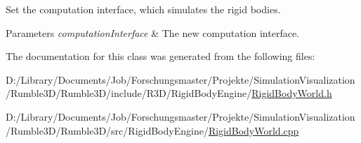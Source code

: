Set the computation interface, which simulates the rigid bodies. 


\begin{DoxyParams}{Parameters}
{\em computation\+Interface} & The new computation interface. \\
\hline
\end{DoxyParams}


The documentation for this class was generated from the following files\+:\begin{DoxyCompactItemize}
\item 
D\+:/\+Library/\+Documents/\+Job/\+Forschungsmaster/\+Projekte/\+Simulation\+Visualization/\+Rumble3\+D/\+Rumble3\+D/include/\+R3\+D/\+Rigid\+Body\+Engine/\mbox{\hyperlink{_rigid_body_world_8h}{Rigid\+Body\+World.\+h}}\item 
D\+:/\+Library/\+Documents/\+Job/\+Forschungsmaster/\+Projekte/\+Simulation\+Visualization/\+Rumble3\+D/\+Rumble3\+D/src/\+Rigid\+Body\+Engine/\mbox{\hyperlink{_rigid_body_world_8cpp}{Rigid\+Body\+World.\+cpp}}\end{DoxyCompactItemize}
